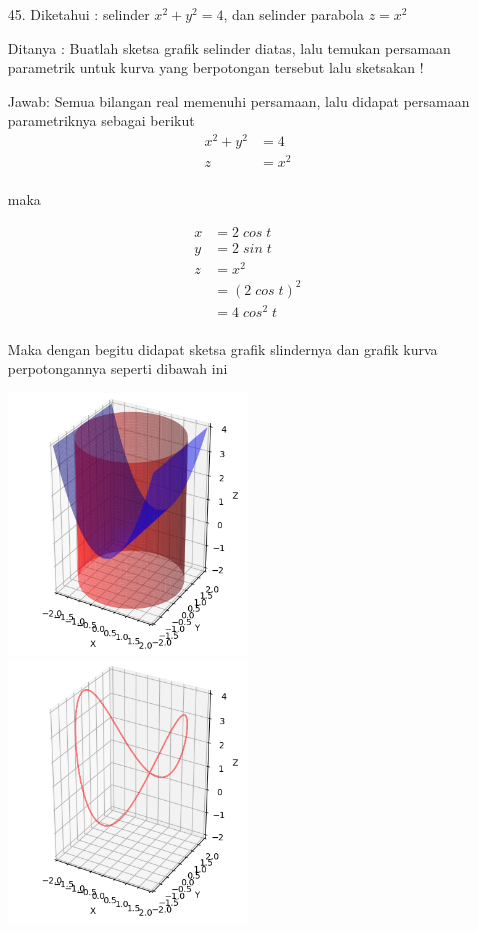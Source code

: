 \documentclass[twoside]{scrarticle}
\begin{document}
\begin{enumerate}
		\item[45.] Diketahui : selinder $x^2 + y^2=4$, dan selinder parabola  $z = x^2$
		
		Ditanya : Buatlah sketsa grafik selinder diatas, lalu temukan persamaan parametrik untuk kurva yang berpotongan tersebut lalu sketsakan !
		
		Jawab: Semua bilangan real memenuhi persamaan, lalu didapat persamaan parametriknya sebagai berikut
		\begin{equation*}
			\begin{aligned}
				x^2 + y^2 & = 4\\
				z & = x^2\\
			\end{aligned}
		\end{equation*}
		\centerline{maka}
		\begin{equation*}
			\begin{aligned}
				x & =2\;cos\;t\\
				y & =2\;sin\;t\\
				z & = x^2\\
				& = (2\;cos\;t)^2\\
				& = 4\;cos^2\;t\\ 
			\end{aligned}
		\end{equation*}
		
		Maka dengan begitu didapat sketsa grafik slindernya dan grafik kurva perpotongannya seperti dibawah ini
		
		\begin{minipage}{\linewidth}
			\includegraphics[width=0.5\textwidth]{45.png}
			\includegraphics[width=0.5\textwidth]{45_1.png}
		\end{minipage}
		

\end{enumerate}
\end{document}
